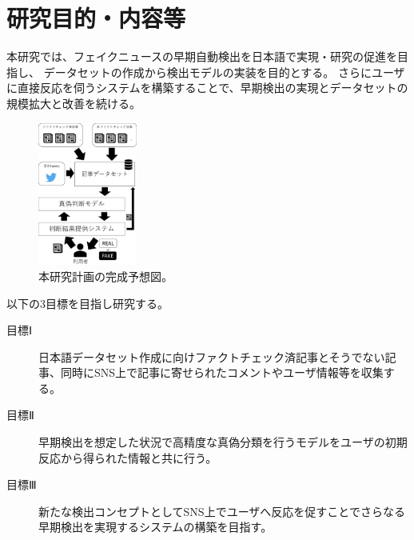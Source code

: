 
\section{研究目的・内容等}

\vspace{20pt}
本研究では、フェイクニュースの早期自動検出を日本語で実現・研究の促進を目指し、
データセットの作成から検出モデルの実装を目的とする。
さらにユーザに直接反応を伺うシステムを構築することで、早期検出の実現とデータセットの規模拡大と改善を続ける。


\setlength\intextsep{0pt}
\setlength\textfloatsep{0pt}
\begin{figure}
    \vspace{-2\baselineskip}
    \centering
    \includegraphics[width=0.29\textwidth]{figs/dataset.pdf}
    \vspace{-1cm} 
    \caption{本研究計画の完成予想図。}
    \label{fig:dataset}
    \vspace{-3\baselineskip}
\end{figure}

以下の3目標を目指し研究する。
\begin{description}
    \item[目標Ⅰ] 日本語データセット作成に向けファクトチェック済記事とそうでない記事、同時にSNS上で記事に寄せられたコメントやユーザ情報等を収集する。
    \item[目標Ⅱ] 早期検出を想定した状況で高精度な真偽分類を行うモデルをユーザの初期反応から得られた情報と共に行う。
    \item[目標Ⅲ] 新たな検出コンセプトとしてSNS上でユーザへ反応を促すことでさらなる早期検出を実現するシステムの構築を目指す。
\end{description}

